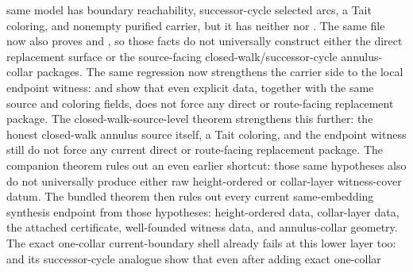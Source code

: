 \documentclass[11pt]{article}
\begin{document}
\begin{itemize}
same model has boundary reachability, successor-cycle selected arcs, a Tait
coloring, and nonempty purified carrier, but it has neither
 nor
.  The same file now
also proves
and
,
so those facts do not universally construct either the direct replacement
surface or the source-facing closed-walk/successor-cycle annulus-collar
packages.  The same regression now strengthens the carrier side to the local
endpoint witness:
 and
show that even explicit  data, together
with the same source and coloring fields, does not force any direct or
route-facing replacement package.  The closed-walk-source-level theorem
strengthens this further: the honest closed-walk annulus source itself, a Tait
coloring, and the endpoint witness still do not force any current direct or
route-facing replacement package.  The companion theorem
rules out an even earlier shortcut: those same hypotheses also do not
universally produce either raw height-ordered or collar-layer witness-cover
datum.  The bundled theorem
then rules out every current same-embedding synthesis endpoint from those
hypotheses: height-ordered data, collar-layer data, the attached certificate,
well-founded witness data, and annulus-collar geometry.  The exact one-collar
current-boundary shell already fails at this lower layer too:
and its successor-cycle analogue show that even after adding exact one-collar

\end{itemize}
\end{document}
